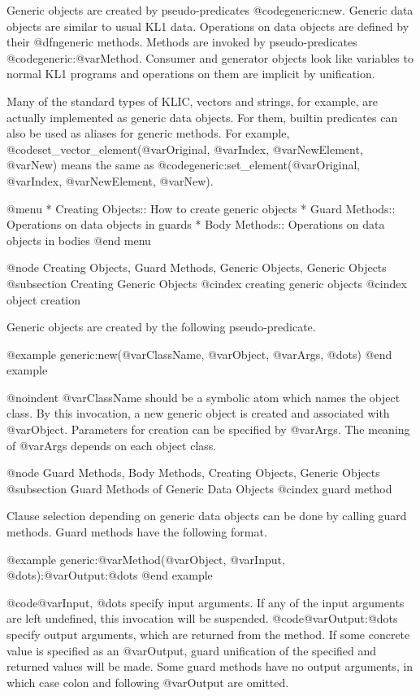 Generic objects are created by pseudo-predicates @code{generic:new}.
Generic data objects are similar to usual KL1 data.  Operations on data
objects are defined by their @dfn{generic methods}.  Methods are invoked
by pseudo-predicates @code{generic:@var{Method}}.  Consumer and
generator objects look like variables to normal KL1 programs and
operations on them are implicit by unification.

Many of the standard types of KLIC, vectors and strings, for example,
are actually implemented as generic data objects.  For them, builtin
predicates can also be used as aliases for generic methods.  For
example, @code{set_vector_element(@var{Original}, @var{Index},
@var{NewElement}, @var{New})} means the same as
@code{generic:set_element(@var{Original}, @var{Index}, @var{NewElement},
@var{New})}.

@menu
* Creating Objects::            How to create generic objects
* Guard Methods::               Operations on data objects in guards
* Body Methods::                Operations on data objects in bodies
@end menu

@node Creating Objects, Guard Methods, Generic Objects, Generic Objects
@subsection Creating Generic Objects
@cindex creating generic objects
@cindex object creation

Generic objects are created by the following pseudo-predicate.

@example
generic:new(@var{ClassName}, @var{Object}, @var{Args}, @dots{})
@end example

@noindent
@var{ClassName} should be a symbolic atom which names the object class.
By this invocation, a new generic object is created and associated with
@var{Object}.  Parameters for creation can be specified by @var{Args}.
The meaning of @var{Args} depends on each object class.

@node Guard Methods, Body Methods, Creating Objects, Generic Objects
@subsection Guard Methods of Generic Data Objects
@cindex guard method

Clause selection depending on generic data objects can be done by
calling guard methods.  Guard methods have the following format.

@example
generic:@var{Method}(@var{Object}, @var{Input}, @dots{}):@var{Output}:@dots{}
@end example

@code{@var{Input}, @dots{}} specify input arguments.  If any of the
input arguments are left undefined, this invocation will be suspended.
@code{@var{Output}:@dots{}} specify output arguments, which are returned
from the method.  If some concrete value is specified as an
@var{Output}, guard unification of the specified and returned values
will be made.  Some guard methods have no output arguments, in which
case colon and following @var{Output} are omitted.

